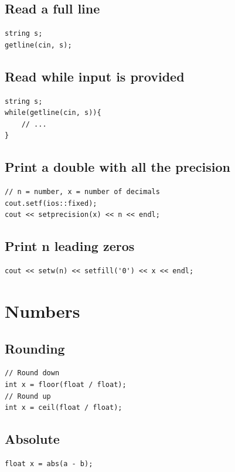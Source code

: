 \documentclass[10pt]{article}
\begin{document}
\begin{multicols*}{2}
\subsection{Read a full line}
\begin{lstlisting}[style=compactcpp]
string s;
getline(cin, s);
\end{lstlisting}

\subsection{Read while input is provided}
\begin{lstlisting}[style=compactcpp]
string s;
while(getline(cin, s)){
    // ...
}
\end{lstlisting}

\subsection{Print a double with all the precision}
\begin{lstlisting}[style=compactcpp]
// n = number, x = number of decimals
cout.setf(ios::fixed);
cout << setprecision(x) << n << endl;
\end{lstlisting}

\subsection{Print n leading zeros}
\begin{lstlisting}[style=compactcpp]
cout << setw(n) << setfill('0') << x << endl;
\end{lstlisting}

\section{Numbers}

\subsection{Rounding}
\begin{lstlisting}[style=compactcpp]
// Round down
int x = floor(float / float);
// Round up
int x = ceil(float / float);
\end{lstlisting}

\subsection{Absolute}
\begin{lstlisting}[style=compactcpp]
float x = abs(a - b);
\end{lstlisting}


\end{multicols*}
\end{document}
